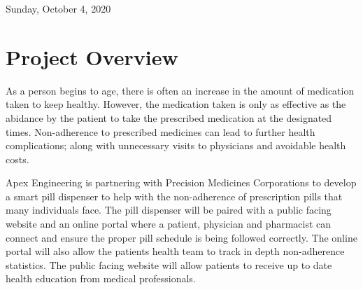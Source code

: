 \documentclass[12pt,titlepage]{article}
\begin{document}
\begin{titlepage}
\vfill
{\large Sunday, October 4, 2020}\\[3cm] %

\end{titlepage}

\pagebreak
{}
\pagebreak
{}

\section{Project Overview}
As a person begins to age, there is often an increase in the amount of medication taken to keep healthy. However, the medication taken is only as effective as the abidance by the patient to take the prescribed medication at the designated times. Non-adherence to prescribed medicines can lead to further health complications; along with unnecessary visits to physicians and avoidable health costs. 

Apex Engineering is partnering with Precision Medicines Corporations to develop a smart pill dispenser to help with the non-adherence of prescription pills that many individuals face. The pill dispenser will be paired with a public facing website and an online portal where a patient, physician and pharmacist can connect and ensure the proper pill schedule is being followed correctly. The online portal will also allow the patients health team to track in depth non-adherence statistics. The public facing website will allow patients to receive up to date health education from medical professionals.
\end{document}
